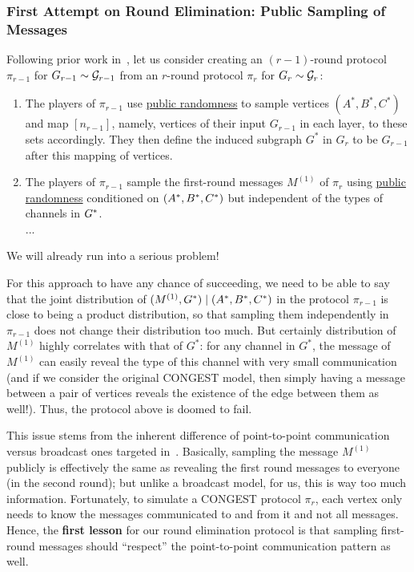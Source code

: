 \documentclass[11pt]{article}
\theoremstyle{definition}
\newenvironment{tbox}{\begin{tcolorbox}[
		enlarge top by=5pt,
		enlarge bottom by=5pt,
		 breakable,
		 boxsep=0pt,
                  left=4pt,
                  right=4pt,
                  top=10pt,
                  arc=4pt,
                  boxrule=1pt,toprule=1pt,
                  colback=white
                  ]%
	}
{\end{tcolorbox}}
\newcommand{\prot}{\ensuremath{\pi}}
\begin{document}
\subsubsection{First Attempt on Round Elimination: Public Sampling of Messages}\label{sec:attempt1}
Following prior work in~, let us consider creating an $(r-1)$-round protocol $\prot_{r-1}$ for $G_{r-1} \sim \mathcal{G}_{r-1}$ from an $r$-round protocol $\prot_r$ for $G_r \sim \mathcal{G}_r$: 
\begin{tbox}
	\begin{enumerate}
		\item The players of $\prot_{r-1}$ use \underline{public randomness} to sample vertices $(A^*,B^*,C^*)$ and map $[n_{r-1}]$, namely, vertices of their input $G_{r-1}$ in each layer,
		to these sets accordingly. They then define the induced subgraph $G^*$ in $G_r$ to be $G_{r-1}$ after this mapping of vertices. 
		
		\item The players of $\prot_{r-1}$ sample the first-round messages $M^{(1)}$ of $\prot_r$ using \underline{public randomness} conditioned on $(A^*,B^*,C^*)$ but independent of the types of channels in $G^*$.  \\
		...
	\end{enumerate}
	We will already run into a serious problem!
\end{tbox}

For this approach to have any chance of succeeding, we need to be able to say that the joint distribution of $(M^{(1)},G^*) \mid (A^*,B^*,C^*)$ in the protocol $\prot_{r-1}$ is close to being a product distribution, so that 
sampling them independently in $\prot_{r-1}$ does not change their distribution too much. But certainly distribution of $M^{(1)}$ highly correlates with that of $G^*$: for any channel in $G^*$, 
the message of $M^{(1)}$ can easily reveal the type of this channel with very small communication (and if we consider the original CONGEST model, then simply having a message between a pair of vertices reveals the existence of the edge
between them as well!). Thus, the protocol above is doomed to fail. 

This issue stems from the inherent difference of point-to-point communication versus broadcast ones targeted in~. 
Basically, sampling the message $M^{(1)}$ publicly is effectively the same as revealing the first round messages to everyone (in the second round); 
but unlike a broadcast model, for us, this is way too much information. Fortunately, to simulate a CONGEST protocol $\prot_r$, each vertex only needs to know the messages
communicated to and from it and not all messages. Hence, the \textbf{first lesson} for our round elimination protocol is that sampling first-round messages should ``respect'' the 
point-to-point communication pattern as well. 
\end{document}
